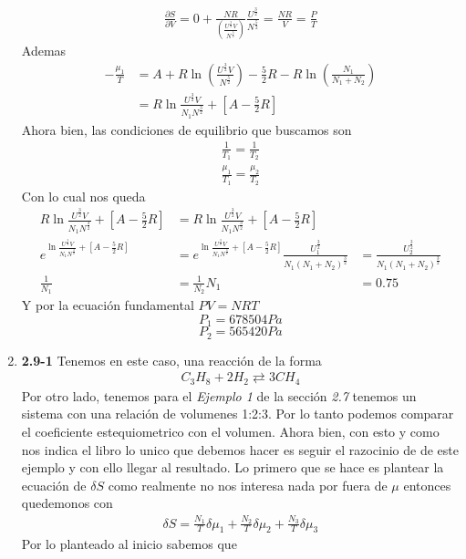 \documentclass[12pt]{exam}
\begin{document}
\begin{enumerate}
\begin{align*}
			\frac{\partial S}{\partial V} = 0 + \frac{NR}{\left(\frac{U^{\frac{3}{2}}V}{N^{\frac{5}{2}}}\right)}\frac{U^{\frac{3}{2}}}{N^{\frac{5}{2}}} = \frac{NR}{V} = \frac{P}{T}
		\end{align*}
		Ademas
		\begin{align*}
			-\frac{\mu_1}{T} &= A + R\ln(\frac{U^{\frac{3}{2}}V}{N^{\frac{5}{2}}})-\frac{5}{2}R-R\ln\left(\frac{N_1}{N_1+N_2}\right)\\
			&= R\ln\frac{U^{\frac{3}{2}}V}{N_1N^{\frac{3}{2}}}+\left[A-\frac{5}{2}R\right]
		\end{align*}
Ahora bien, las condiciones de equilibrio que buscamos son
\begin{align*}
	\frac{1}{T_1}=\frac{1}{T_2}\\
	\frac{\mu_1}{T_1}= \frac{\mu_2}{T_2}
\end{align*}
Con lo cual nos queda
\begin{align*}
	R\ln\frac{U^{\frac{3}{2}}V}{N_1N^{\frac{3}{2}}}+\left[A-\frac{5}{2}R\right] &= R\ln\frac{U^{\frac{3}{2}}V}{N_1N^{\frac{3}{2}}}+\left[A-\frac{5}{2}R\right]\\
	e^{\ln\frac{U^{\frac{3}{2}}V}{N_1N^{\frac{3}{2}}}+\left[A-\frac{5}{2}R\right]} &= e^{\ln\frac{U^{\frac{3}{2}}V}{N_1N^{\frac{3}{2}}}+\left[A-\frac{5}{2}R\right]}
	\frac{U_1^{\frac{3}{2}}}{N_1(N_1+N_2)^{\frac{3}{2}}}&=\frac{U_2^{\frac{3}{2}}}{N_1(N_1+N_2)^{\frac{3}{2}}}\\
	\frac{1}{N_1}&=\frac{1}{N_2}
	N_1&=0.75
\end{align*}
Y por la ecuación fundamental $PV=NRT$
$$P_1=678504Pa$$
$$P_2=565420Pa$$
	\item \textbf{2.9-1} Tenemos en este caso, una reacción de la forma
		\begin{align*}
			C_3H_8 + 2H_2 \rightleftarrows 3CH_4
		\end{align*}
		Por otro lado, tenemos para el \textit{Ejemplo 1} de la sección \textit{2.7} tenemos un sistema con una relación de volumenes 1:2:3. Por lo tanto podemos comparar el coeficiente estequiometrico con el volumen. Ahora bien, con esto y como nos indica el libro lo unico que debemos hacer es seguir el razocinio de de este ejemplo y con ello llegar al resultado. 
		Lo primero que se hace es plantear la ecuación de $\delta S$ como realmente no nos interesa nada por fuera de $\mu$ entonces quedemonos con
		\begin{align*}
			\delta S = \frac{N_1}{T}\delta\mu_1 + \frac{N_2}{T}\delta\mu_2 + \frac{N_3}{T}\delta\mu_3
		\end{align*}
		Por lo planteado al inicio sabemos que

\end{enumerate}
\end{document}
